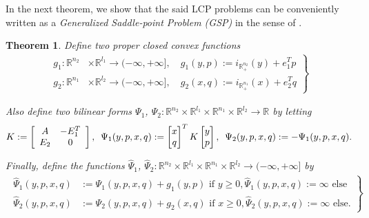 \documentclass{article} %
\newtheorem{theorem}{Theorem} \newtheorem{lemma}[theorem]{Lemma}
\begin{document}
In the next theorem, we show that the said LCP problems can be
conveniently written as a \textit{Generalized Saddle-point Problem
  (GSP)} in the sense of \cite{he2013accelerating}.
\begin{theorem}
Define two proper closed convex functions
  \begin{eqnarray}
    \left.
    \begin{aligned}
      g_1: \mathbb{R}^{n_2} &\times \mathbb{R}^{l_1} \rightarrow
      (-\infty, +\infty], \hspace{1em} g_1(y, p) :=
        i_{\mathbb{R}^{n_2}_+}(y) + e_1^Tp\\
        g_2: \mathbb{R}^{n_1} &\times \mathbb{R}^{l_2} \rightarrow
        (-\infty, +\infty],\hspace{1em} g_2(x, q) :=
          i_{\mathbb{R}^{n_1}_+}(x) + e_2^Tq
    \end{aligned}
    \right\}
    \label{eq:things}
  \end{eqnarray}

Also define two bilinear forms $\Psi_1$, $\Psi_2: \mathbb{R}^{n_2}
\times \mathbb{R}^{l_1} \times \mathbb{R}^{n_1} \times
\mathbb{R}^{l_2} \rightarrow \mathbb{R}$ by letting
  \begin{equation}
      K :=
      \left[
        \begin{array}{cc}
          A & -E_1^T \\
          E_2 & 0
        \end{array}
        \right],\hspace{.5em}
    \Psi_1(y, p, x, q)
    := \begin{bmatrix}x\\q\end{bmatrix}^TK\begin{bmatrix}y\\p\end{bmatrix}, \hspace{.5em}
      \Psi_2(y, p, x, q) := -\Psi_1(y, p, x, q).
\end{equation}

Finally, define the functions $\hat{\Psi}_1$, $\hat{\Psi}_2:
\mathbb{R}^{n_2} \times \mathbb{R}^{l_1} \times \mathbb{R}^{n_1}
\times \mathbb{R}^{l_2} \rightarrow (-\infty, +\infty]$ by
\begin{eqnarray}
  \left.
  \begin{aligned}
    \hat{\Psi}_1(y, p, x, q) &:=
    \Psi_1(y, p, x, q)+ g_1(y, p) \text{ if }y \ge 0, \hat{\Psi}_1(y,
    p, x, q) := \infty \text{ else}\\
    \hat{\Psi}_2(y, p, x, q) &:= \Psi_2(y, p, x, q)+ g_2(x, q) \text{ if
    }x \ge 0, \hat{\Psi}_2(y,p, x, q) := \infty \text{ else}.
  \end{aligned}
  \right\}
\end{eqnarray}


\end{theorem}
\end{document}
